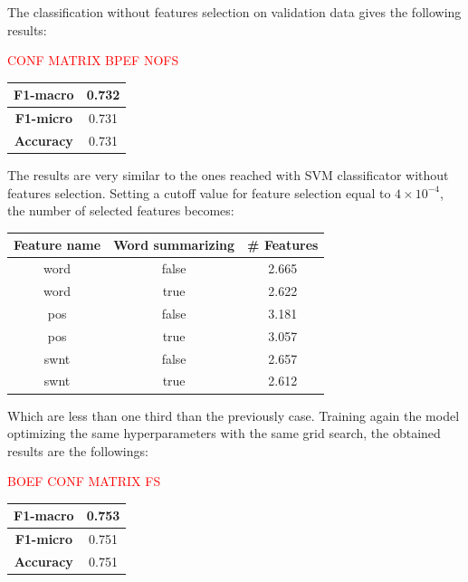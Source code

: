 The classification without features selection on validation data gives the following results:

\textcolor{red}{CONF MATRIX BPEF NOFS}
\begin{center}
	\begin{tabular}{ | c | c | } 
		\hline
		\textbf{F1-macro} & 0.732 \\
		\hline
		\textbf{F1-micro} & 0.731 \\ 
		\hline
		\textbf{Accuracy} & 0.731 \\ 
		\hline
	\end{tabular}
\end{center}


The results are very similar to the ones reached with SVM classificator without features selection. Setting a cutoff value for feature selection equal to $4\times10^{-4}$, the number of selected features becomes:

\begin{center}
	\begin{tabular}{ c  c  c } 
		\hline
		\textbf{Feature name} & \textbf{Word summarizing} & \textbf{\# Features} \\
		\hline
		word & false & 2.665 \\ 
		\hline
		word & true & 2.622 \\ 
		\hline
		pos & false & 3.181 \\ 
		\hline
		pos & true & 3.057 \\ 
		\hline
		swnt & false & 2.657 \\ 
		\hline
		swnt & true & 2.612 \\ 
		\hline
	\end{tabular}
\end{center}


Which are less than one third than the previously case. Training again the model optimizing the same hyperparameters with the same grid search, the obtained results are the followings:

\textcolor{red}{BOEF CONF MATRIX FS}

\begin{center}
	\begin{tabular}{ | c | c | } 
		\hline
		\textbf{F1-macro} & 0.753 \\
		\hline
		\textbf{F1-micro} & 0.751 \\ 
		\hline
		\textbf{Accuracy} & 0.751 \\ 
		\hline
	\end{tabular}
\end{center}

